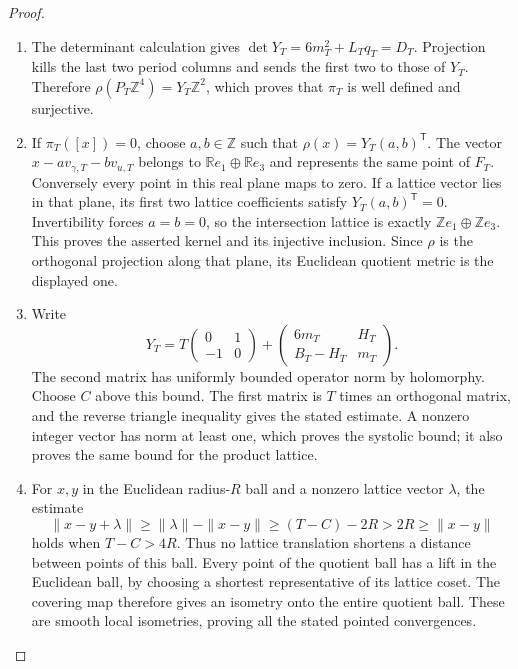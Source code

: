 \begin{proof}
\begin{enumerate}[label=\arabic*.,leftmargin=*]
\item The determinant calculation gives
$\det Y_T=6m_T^2+L_Tq_T=D_T$.  Projection kills the last two period
columns and sends the first two to those of $Y_T$.  Therefore
$\rho(P_T\mathbb Z^4)=Y_T\mathbb Z^2$, which proves that $\pi_T$ is
well defined and surjective.

\item If $\pi_T([x])=0$, choose $a,b\in\mathbb Z$ such that
$\rho(x)=Y_T(a,b)^{\mathsf T}$.  The vector
$x-av_{\gamma,T}-bv_{u,T}$ belongs to
$\mathbb Re_1\oplus\mathbb Re_3$ and represents the same point of
$F_T$.  Conversely every point in this real plane maps to zero.
If a lattice vector lies in that plane, its first two lattice
coefficients satisfy $Y_T(a,b)^{\mathsf T}=0$.  Invertibility forces
$a=b=0$, so the intersection lattice is exactly
$\mathbb Ze_1\oplus\mathbb Ze_3$.  This proves the asserted kernel and
its injective inclusion.  Since $\rho$ is the orthogonal projection
along that plane, its Euclidean quotient metric is the displayed one.

\item Write
\[
 Y_T=T\begin{pmatrix}0&1\\-1&0\end{pmatrix}
       +\begin{pmatrix}6m_T&H_T\\B_T-H_T&m_T\end{pmatrix}.
\]
The second matrix has uniformly bounded operator norm by holomorphy.
Choose $C$ above this bound.  The first matrix is $T$ times an orthogonal
matrix, and the reverse triangle inequality gives the stated estimate.
A nonzero integer vector has norm at least one, which proves the
systolic bound; it also proves the same bound for the product lattice.

\item For $x,y$ in the Euclidean radius-$R$ ball and a nonzero lattice vector
$\lambda$, the estimate
\[
 \|x-y+\lambda\|\geq\|\lambda\|-\|x-y\|
 \geq(T-C)-2R>2R\geq\|x-y\|
\]
holds when $T-C>4R$.  Thus no lattice translation shortens a distance
between points of this ball.  Every point of the quotient ball has a
lift in the Euclidean ball, by choosing a shortest representative of
its lattice coset.  The covering map therefore gives an isometry onto
the entire quotient ball.  These are smooth local isometries, proving
all the stated pointed convergences.
\end{enumerate}
\end{proof}


